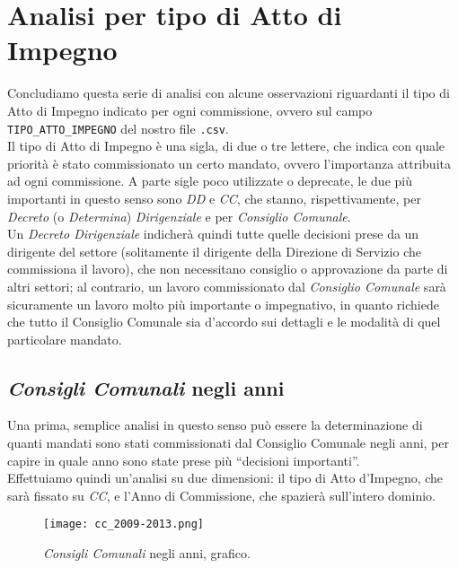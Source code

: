 		\FloatBarrier
		
	\section{Analisi per tipo di Atto di Impegno} \label{sec:tipo_atto_impegno}
		
		Concludiamo questa serie di analisi con alcune osservazioni riguardanti il tipo di Atto di Impegno indicato per ogni commissione, ovvero sul campo \texttt{TIPO\_ATTO\_IMPEGNO} del nostro file \texttt{.csv}.\\
		Il tipo di Atto di Impegno è una sigla, di due o tre lettere, che indica con quale priorità è stato commissionato un certo mandato, ovvero l'importanza attribuita ad ogni commissione. A parte sigle poco utilizzate o deprecate, le due più importanti in questo senso sono \textit{DD} e \textit{CC}, che stanno, rispettivamente, per \textit{Decreto} (o \textit{Determina}) \textit{Dirigenziale} e per \textit{Consiglio Comunale}.\\
		Un \textit{Decreto Dirigenziale} indicherà quindi tutte quelle decisioni prese da un dirigente del settore (solitamente il dirigente della Direzione di Servizio che commissiona il lavoro), che non necessitano consiglio o approvazione da parte di altri settori; al contrario, un lavoro commissionato dal \textit{Consiglio Comunale} sarà sicuramente un lavoro molto più importante o impegnativo, in quanto richiede che tutto il Consiglio Comunale sia d'accordo sui dettagli e le modalità di quel particolare mandato.
		
		\subsection{\textit{Consigli Comunali} negli anni} \label{subsec:cc_negli_anni}
		
			Una prima, semplice analisi in questo senso può essere la determinazione di quanti mandati sono stati commissionati dal Consiglio Comunale negli anni, per capire in quale anno sono state prese più ``decisioni importanti''.\\
			Effettuiamo quindi un'analisi su due dimensioni: il tipo di Atto d'Impegno, che sarà fissato su \textit{CC}, e l'Anno di Commissione, che spazierà sull'intero dominio.\\
			
			\begin{figure}[h!]
				\centering
					\texttt{[image: cc\_2009-2013.png]}
				\caption{\textit{Consigli Comunali} negli anni, grafico.}
				\label{fig:cc_2009-2013}
			\end{figure}
			
